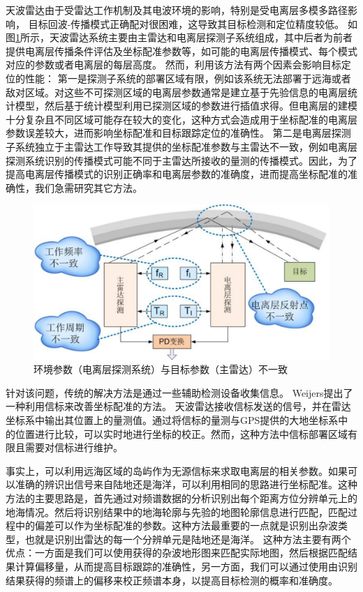 天波雷达由于受雷达工作机制及其电波环境的影响，特别是受电离层多模多路径影响，
目标回波-传播模式正确配对很困难，这导致其目标检测和定位精度较低。
如图\ref{fig:pdproblem}所示，天波雷达系统主要由主雷达和电离层探测子系统组成，其中后者为前者提供电离层传播条件评估及坐标配准参数等，如可能的电离层传播模式、每个模式对应的参数或者电离层的每层高度。
然而，利用该方法有两个因素会影响目标定位的性能：
第一是探测子系统的部署区域有限，例如该系统无法部署于远海或者敌对区域。对这些不可探测区域的电离层参数通常是建立基于先验信息的电离层统计模型，然后基于统计模型利用已探测区域的参数进行插值求得。但电离层的建模十分复杂且不同区域可能存在较大的变化，这种方式会造成用于坐标配准的电离层参数误差较大，进而影响坐标配准和目标跟踪定位的准确性。
第二是电离层探测子系统独立于主雷达工作导致其提供的坐标配准参数与主雷达不一致，例如电离层探测系统识别的传播模式可能不同于主雷达所接收的量测的传播模式。因此，为了提高电离层传播模式的识别正确率和电离层参数的准确度，进而提高坐标配准的准确性，我们急需研究其它方法。

\begin{figure}[hbt]
\centering
\includegraphics[width=13.5cm]{figures/introduction/pdproblem}
\caption{环境参数（电离层探测系统）与目标参数（主雷达）不一致}
\label{fig:pdproblem}
\end{figure}

针对该问题，传统的解决方法是通过一些辅助检测设备收集信息。
Weijers提出了一种利用信标来改善坐标配准的方法。
天波雷达接收信标发送的信号，并在雷达坐标系中输出其位置上的量测值。通过将信标的量测与GPS提供的大地坐标系中的位置进行比较，可以实时地进行坐标的校正。然而，这种方法中信标部署区域有限且需要对信标进行维护。

事实上，可以利用远海区域的岛屿作为无源信标来求取电离层的相关参数。如果可以准确的辨识出信号来自陆地还是海洋，可以利用相同的思路进行坐标配准。这种方法的主要思路是，首先通过对频谱数据的分析识别出每个距离方位分辨单元上的地海情况。然后将识别结果中的地海轮廓与先验的地图轮廓信息进行匹配，匹配过程中的偏差可以作为坐标配准的参数。这种方法最重要的一点就是识别出杂波类型，也就是识别出雷达的每一个分辨单元是陆地还是海洋。
这种方法主要有两个优点：一方面是我们可以使用获得的杂波地形图来匹配实际地图，然后根据匹配结果计算偏移量，从而提高目标跟踪的准确性，另一方面，我们可以通过使用由识别结果获得的频谱上的偏移来校正频谱本身，以提高目标检测的概率和准确度。


